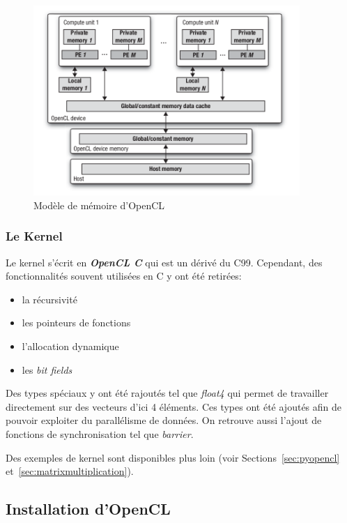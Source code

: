 \begin{figure}[h]
\begin{center}
    \includegraphics[width=0.9\textwidth]{../../resources/memory_model.png}
    \caption{Modèle de mémoire d'OpenCL}
    \label{fig:memory_model}
\end{center}
\end{figure}

\subsubsection{Le Kernel}

Le kernel s'écrit en \textit{\textbf{OpenCL C}} qui est un dérivé du C99. 
Cependant, des fonctionnalités souvent utilisées en C y ont été retirées:
\begin{itemize}
    \item la récursivité
    \item les pointeurs de fonctions
    \item l'allocation dynamique
    \item les \textit{bit fields}
\end{itemize}

Des types spéciaux y ont été rajoutés tel que \textit{float4} qui permet de 
travailler directement sur des vecteurs d'ici 4 éléments. Ces types ont été 
ajoutés afin de pouvoir exploiter du parallélisme de données.
On retrouve aussi l'ajout de fonctions de synchronisation tel que \textit{barrier}.

Des exemples de kernel sont disponibles plus loin (voir Sections~\ref{sec:pyopencl}
et~\ref{sec:matrixmultiplication}).

\subsection{Installation d'OpenCL}

